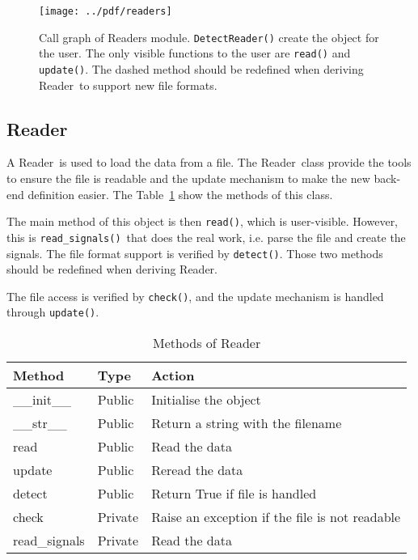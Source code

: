 \documentclass[a4paper,11pt]{article}
\newcommand{\meth}[1]{\texttt{#1()}}
\newcommand{\cls}[1]{\textsf{#1}}
\newcommand{\rd}{\cls{Reader}}
\begin{document}
\begin{figure}[htbp]
  \centering
  \texttt{[image: ../pdf/readers]}
  \caption{Call graph of Readers module. \meth{DetectReader} create the object for the user. The only visible functions to the user are \meth{read} and \meth{update}. The dashed method should be redefined when deriving \rd\ to support new file formats.}
  \label{fig:rds:callgraph}
\end{figure}

\subsection{Reader}
\label{sec:readers:reader}
 
A \rd\ is used to load the data from a file.
The \rd\ class provide the tools to ensure the file is readable and the update mechanism to make the new back-end definition easier.
The Table~\ref{tab:rds:meth} show the methods of this class.

The main method of this object is then \meth{read}, which is user-visible.
However, this is \meth{read\_signals}\ that does the real work, i.e. parse the file and create the signals.
The file format support is verified by \meth{detect}.
Those two methods should be redefined when deriving \rd.

The file access is verified by \meth{check}, and the update mechanism is handled through \meth{update}.

\begin{table}[htbp]
  \centering\sf\small
  \begin{tabular}{lll}
    \hline
    Method & Type & Action \\
    \hline
    \_\_init\_\_ & Public & Initialise the object \\
    \_\_str\_\_  & Public & Return a string with the filename\\
    read         & Public & Read the data\\
    update       & Public & Reread the data\\
    detect       & Public & Return True if file is handled\\
    check        & Private& Raise an exception if the file is not readable\\
    read\_signals    & Private& Read the data \\
    \hline
  \end{tabular}
  \caption{Methods of \rd}
  \label{tab:rds:meth}
\end{table}
\end{document}
